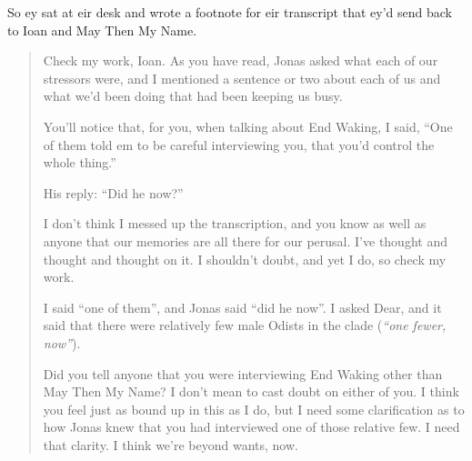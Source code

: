 So ey sat at eir desk and wrote a footnote for eir transcript that ey'd send back to Ioan and May Then My Name.

\begin{quote}
Check my work, Ioan. As you have read, Jonas asked what each of our stressors were, and I mentioned a sentence or two about each of us and what we'd been doing that had been keeping us busy.

You'll notice that, for you, when talking about End Waking, I said, ``One of them told em to be careful interviewing you, that you'd control the whole thing.''

His reply: ``Did he now?''

I don't think I messed up the transcription, and you know as well as anyone that our memories are all there for our perusal. I've thought and thought and thought on it. I shouldn't doubt, and yet I do, so check my work.

I said ``one of them'', and Jonas said ``did he now''. I asked Dear, and it said that there were relatively few male Odists in the clade (\emph{``one fewer, now''}).

Did you tell anyone that you were interviewing End Waking other than May Then My Name? I don't mean to cast doubt on either of you. I think you feel just as bound up in this as I do, but I need some clarification as to how Jonas knew that you had interviewed one of those relative few. I need that clarity. I think we're beyond wants, now.
\end{quote}
